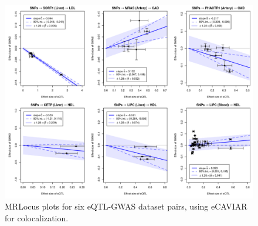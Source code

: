 \documentclass[11pt]{article}
\begin{document}
\begin{figure}[!ht]
  \centering
  \includegraphics[width=\textwidth]{figs/real_loci_ecav-mrlocus.png}
  \caption{MRLocus plots for six eQTL-GWAS dataset pairs, using
    eCAVIAR for colocalization.} 
\end{figure}
\end{document}
